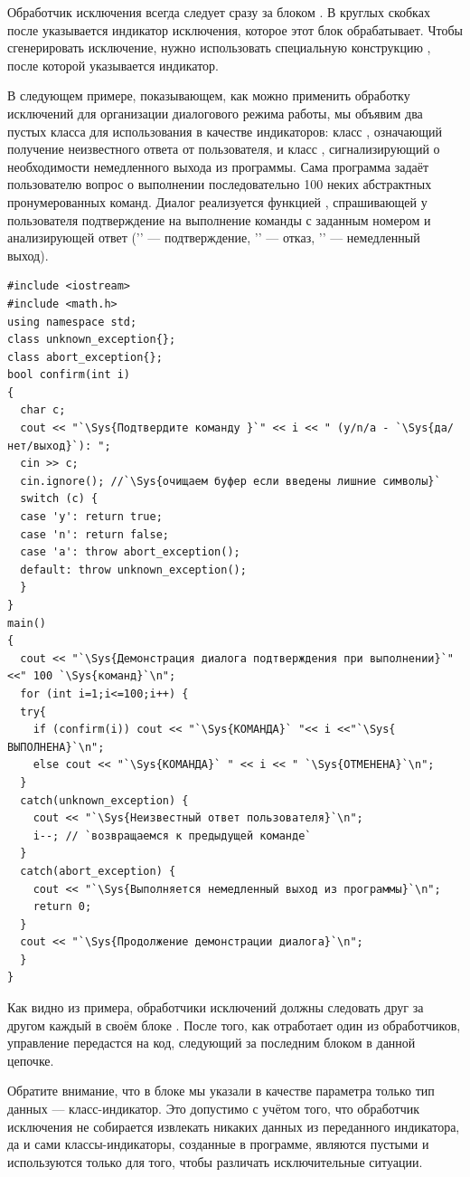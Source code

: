 Обработчик исключения всегда следует сразу за блоком . В круглых скобках после
 указывается индикатор исключения, которое этот блок обрабатывает. Чтобы сгенерировать
исключение, нужно использовать специальную конструкцию , после которой указывается
индикатор. 

В следующем примере, показывающем, как можно применить обработку исключений для организации диалогового режима работы,
мы объявим два пустых класса для использования в качестве индикаторов: класс ,
означающий получение неизвестного ответа от пользователя, и класс ,
сигнализирующий о необходимости немедленного выхода из программы.  Сама программа задаёт пользователю вопрос о
выполнении последовательно 100 неких абстрактных пронумерованных команд. Диалог реализуется функцией
, спрашивающей у пользователя подтверждение на выполнение команды с заданным номером и
анализирующей ответ ('' --- подтверждение, '' --- отказ,
'' --- немедленный выход).
\begin{lstlisting}
#include <iostream>
#include <math.h>
using namespace std;
class unknown_exception{};
class abort_exception{};
bool confirm(int i) 
{
  char c;
  cout << "`\Sys{Подтвердите команду }`" << i << " (y/n/a - `\Sys{да/нет/выход}`): ";
  cin >> c;
  cin.ignore(); //`\Sys{очищаем буфер если введены лишние символы}`
  switch (c) {
  case 'y': return true;
  case 'n': return false;
  case 'a': throw abort_exception();
  default: throw unknown_exception();
  }
}
main() 
{
  cout << "`\Sys{Демонстрация диалога подтверждения при выполнении}`"<<" 100 `\Sys{команд}`\n";
  for (int i=1;i<=100;i++) {
  try{ 
    if (confirm(i)) cout << "`\Sys{КОМАНДА}` "<< i <<"`\Sys{ ВЫПОЛНЕНА}`\n";
    else cout << "`\Sys{КОМАНДА}` " << i << " `\Sys{ОТМЕНЕНА}`\n";
  }
  catch(unknown_exception) {
    cout << "`\Sys{Неизвестный ответ пользователя}`\n";
    i--; // `возвращаемся к предыдущей команде`
  }
  catch(abort_exception) {
    cout << "`\Sys{Выполняется немедленный выход из программы}`\n";
    return 0;
  }
  cout << "`\Sys{Продолжение демонстрации диалога}`\n";
  }
}
\end{lstlisting}

Как видно из примера, обработчики исключений должны следовать друг за другом каждый в своём блоке
. После того, как отработает один из обработчиков, управление  передастся на код,
следующий за последним блоком  в данной цепочке.

Обратите внимание, что в блоке мы указали в качестве параметра только тип данных ---
класс-индикатор. Это допустимо с учётом того, что обработчик исключения не собирается извлекать никаких данных из
переданного индикатора, да и сами классы-индикаторы, созданные в программе, являются пустыми и используются только для
того, чтобы различать исключительные ситуации.

